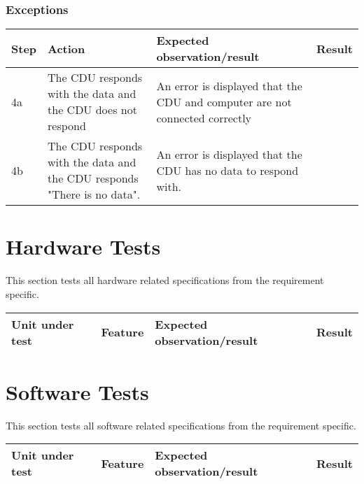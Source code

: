 \subsubsection{Exceptions}
\begin{table}[H]
    \begin{tabular}{|l|p{7cm}|p{5cm}|l|}
    \hline
    Step & Action & Expected observation/result & Result \\ \hline
    4a & The CDU responds with the data and the CDU does not respond & An error is displayed that the CDU and computer are not connected correctly & ~ \\ \hline
    4b & The CDU responds with the data and the CDU responds "There is no data". & An error is displayed that the CDU has no data to respond with. & ~ \\ \hline
    \end{tabular}
\end{table}

\section{Hardware Tests}
This section tests all hardware related specifications from the requirement specific.

\begin{table}[H]
    \begin{tabular}{|l|p{7cm}|p{5cm}|l|}
    \hline
    Unit under test & Feature & Expected observation/result & Result \\ \hline

    \end{tabular}
\end{table}


\section{Software Tests}
This section tests all software related specifications from the requirement specific.

\begin{table}[H]
    \begin{tabular}{|l|p{7cm}|p{5cm}|l|}
    \hline
    Unit under test & Feature & Expected observation/result & Result \\ \hline

    \end{tabular}
\end{table}